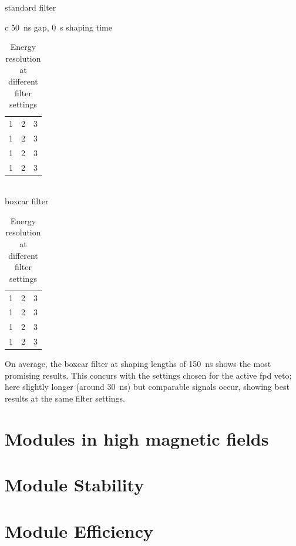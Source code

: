   \begin{table}
	\caption{Energy resolution at different filter settings}
	\centering
	standard filter
	\begin{tabular}{c}
	\SI{50}{\nano\second} gap, \SI{0}{\second} shaping time\\
	
  	\begin{tabular}{ccc}
  		1& 2& 3\\
  		1& 2& 3\\
  		1& 2& 3\\
  		1& 2& 3\\
  	\end{tabular}
  	\end{tabular}\\
  	boxcar filter
  	\begin{tabular}{ccc}
  		1& 2& 3\\
  		1& 2& 3\\
  		1& 2& 3\\
  		1& 2& 3\\
  	\end{tabular}

  \end{table}
  On average, the boxcar filter at shaping lengths  of \SI{150}{\nano\second} shows the most promising results. This concurs with the settings chosen for the active fpd veto; here slightly longer (around \SI{30}{\nano\second}) but comparable signals occur, showing best results at the same filter settings\cite{KevinWierman}.
  
  \section{Modules in high magnetic fields}
  \label{ch:Analysis:sec:Modules in high magnetic fields}
  
  \section{Module Stability}
  \label{ch:Analysis:sec:Module Stability}

  \section{Module Efficiency}
  \label{ch:Analysis:sec:Module Efficiency}
  

